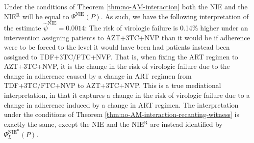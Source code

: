 \documentclass[12pt]{article}
\begin{document}
Under the conditions of Theorem \ref{thm:no-AM-interaction} %
both the NIE and the NIE$^{\text{R}}$ will be equal to $\Psi^{\text{NIE}}(P)$. As such, we have the following interpretation of the estimate $\hat{\psi}^{\text{NIE}}=0.0014$: The risk of virologic failure is 0.14\% higher under an intervention assigning patients to AZT+3TC+NVP than it would be if adherence were to be forced to the level it would have been had patients instead been assigned to TDF+3TC/FTC+NVP. 
That is, when fixing the ART regimen to AZT+3TC+NVP, it is the change in the risk of virologic failure due to the change in adherence caused by a change in ART regimen from TDF+3TC/FTC+NVP to AZT+3TC+NVP. This is a true mediational interpretation, in that it captures a change in the risk of virologic failure due to a change in adherence induced by a change in ART regimen. %
The interpretation under the conditions of Theorem \ref{thm:no-AM-interaction-recanting-witness} is exactly the same, except the NIE and the NIE$^{\text{R}}$ are instead identified by $\Psi_{L}^{\text{NIE}^{\text{R}}}(P)$.
\end{document}

